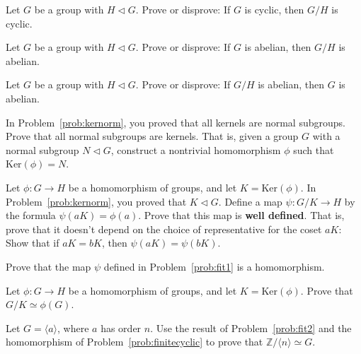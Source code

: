 \begin{problem}
Let \(G\) be a group with \(H \lhd G\). Prove or disprove: If \(G\) is cyclic, then \(G/H\) is cyclic.
\end{problem}

\begin{problem}
Let \(G\) be a group with \(H \lhd G\). Prove or disprove: If \(G\) is abelian, then \(G/H\) is abelian.
\end{problem}

\begin{problem}
Let \(G\) be a group with \(H \lhd G\). Prove or disprove: If \(G/H\) is abelian, then \(G\) is abelian.
\end{problem}

\begin{problem}
 In Problem~\ref{prob:kernorm}, you proved that all kernels are normal subgroups. Prove that all normal subgroups are kernels. That is, given a group \(G\) with a normal subgroup \(N \lhd G\), construct a nontrivial homomorphism \(\phi\) such that \(\mbox{Ker}(\phi)=N\).
\end{problem}

\begin{problem}\label{prob:fit1}
Let \(\phi: G\longrightarrow H\) be a homomorphism of groups, and let \(K = \mbox{Ker}(\phi)\). In Problem~\ref{prob:kernorm}, you proved that \(K \lhd G\). Define a map \(\psi : G/K \longrightarrow H\) by the formula \(\psi(aK)=\phi(a)\). Prove that this map is \textbf{well defined}. That is, prove that it doesn't depend on the choice of representative for the coset \(aK\): Show that if \(aK = bK\), then \(\psi(aK)=\psi(bK)\).
\end{problem}

\begin{problem}
Prove that the map \(\psi\) defined in Problem~\ref{prob:fit1} is a homomorphism.
\end{problem}

\begin{problem}\label{prob:fit2}
Let \(\phi: G\longrightarrow H\) be a homomorphism of groups, and let \(K = \mbox{Ker}(\phi)\). Prove that \(G/K \simeq \phi(G)\).
\end{problem}

\begin{problem}\label{prob:onefincyc}
Let $G = \langle a \rangle$, where $a$ has order $n$. Use the result of Problem~\ref{prob:fit2} and the homomorphism of Problem~\ref{prob:finitecyclic}
to prove that \(\mathbb{Z}/\langle n \rangle \simeq G\).
\end{problem}

